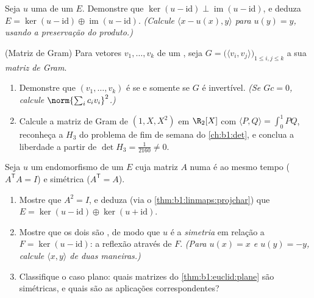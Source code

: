 \begin{exercise}[$\star\star\star$]\label{exo:b1:euclid:10}
Seja $u$ uma  de um  $E$. Demonstre que
$\ker(u - \mathrm{id}) \perp \operatorname{im}(u - \mathrm{id})$, e deduza $E = \ker(u - \mathrm{id}) \oplus \operatorname{im}(u -
\mathrm{id})$. \emph{(Calcule $\langle x - u(x), y\rangle$ para $u(y) = y$, usando a
preservação do produto.)}
\end{exercise}

\begin{exercise}[$\star\star$]\label{exo:b1:euclid:11}
(Matriz de Gram) Para vetores $v_1, \dots, v_k$ de um , seja
$G = \bigl(\langle v_i, v_j\rangle\bigr)_{1 \leq i, j
\leq k}$ a sua \emph{matriz de Gram}.
\begin{enumerate}
  \item Demonstre que $(v_1, \dots, v_k)$ é  se e somente se $G$ é
        invertível. \emph{(Se $Gc = 0$, calcule $\norm{\sum_i c_i v_i}^2$.)}
  \item Calcule a matriz de Gram de $(1, X, X^2)$ em $\R_2[X]$ com $\langle P, Q\rangle = \int_0^1 PQ$,
        reconheça a  $H_3$ do problema de fim de
        semana do \cref{ch:b1:det}, e conclua a liberdade a partir de $\det H_3 =
        \frac1{2160} \neq 0$.
\end{enumerate}
\end{exercise}

\begin{exercise}[$\star\star\star$]\label{exo:b1:euclid:12}
Seja $u$ um endomorfismo de um  $E$ cuja matriz
$A$ numa   é ao mesmo tempo  ($A^{\mathsf T}A
= I$) e
simétrica ($A^{\mathsf T} = A$).
\begin{enumerate}
  \item Mostre que $A^2 = I$, e deduza (via o \cref{thm:b1:linmaps:projchar}) que $E = \ker(u -
        \mathrm{id}) \oplus \ker(u + \mathrm{id})$.
  \item Mostre que os dois  são , de modo que
        $u$ é a \emph{simetria } em relação a $F =
        \ker(u - \mathrm{id})$: a
        reflexão através de $F$. \emph{(Para $u(x) = x$ e $u(y) = -y$, calcule
        $\langle
        x, y\rangle$ de duas maneiras.)}
  \item Classifique o caso plano: quais matrizes do \cref{thm:b1:euclid:plane} são
        simétricas, e quais são as aplicações correspondentes?
\end{enumerate}
\end{exercise}

